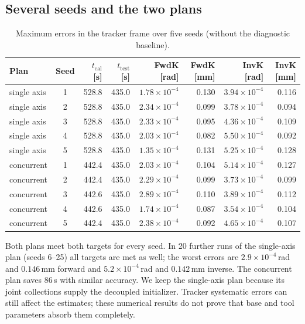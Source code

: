 \documentclass[../main.tex]{subfiles}
\begin{document}
\subsection{Several seeds and the two plans}\label{sec:res-seeds}
\begin{table}[H]
\centering\small
\caption{Maximum errors in the tracker frame over five seeds (without the diagnostic baseline).}\label{tab:res-seeds}
\begin{tabular}{@{}lcrrrrrr@{}}
\toprule
Plan & Seed & $t_{\mathrm{cal}}$ [s] & $t_{\mathrm{test}}$ [s] & FwdK [rad] & FwdK [mm] & InvK [rad] & InvK [mm] \\\midrule
single axis & 1 & 528.8 & 435.0 & $1.78\times10^{-4}$ & 0.130 & $3.94\times10^{-4}$ & 0.116 \\
single axis & 2 & 528.8 & 435.0 & $2.34\times10^{-4}$ & 0.099 & $3.78\times10^{-4}$ & 0.094 \\
single axis & 3 & 528.8 & 435.0 & $2.33\times10^{-4}$ & 0.095 & $4.36\times10^{-4}$ & 0.109 \\
single axis & 4 & 528.8 & 435.0 & $2.03\times10^{-4}$ & 0.082 & $5.50\times10^{-4}$ & 0.092 \\
single axis & 5 & 528.8 & 435.0 & $1.35\times10^{-4}$ & 0.131 & $5.25\times10^{-4}$ & 0.128 \\\midrule
concurrent & 1 & 442.4 & 435.0 & $2.03\times10^{-4}$ & 0.104 & $5.14\times10^{-4}$ & 0.127 \\
concurrent & 2 & 442.4 & 435.0 & $2.29\times10^{-4}$ & 0.099 & $3.73\times10^{-4}$ & 0.099 \\
concurrent & 3 & 442.6 & 435.0 & $2.89\times10^{-4}$ & 0.110 & $3.89\times10^{-4}$ & 0.112 \\
concurrent & 4 & 442.6 & 435.0 & $1.74\times10^{-4}$ & 0.087 & $3.54\times10^{-4}$ & 0.104 \\
concurrent & 5 & 442.4 & 435.0 & $2.38\times10^{-4}$ & 0.092 & $4.65\times10^{-4}$ & 0.107 \\
\bottomrule
\end{tabular}
\end{table}
Both plans meet both targets for every seed. In 20 further runs of the single-axis plan (seeds 6--25) all targets are met as well; the worst errors are $2.9\times10^{-4}$\,rad and $0.146$\,mm forward and $5.2\times10^{-4}$\,rad and $0.142$\,mm inverse. The concurrent plan saves 86\,s with similar accuracy. We keep the single-axis plan because its joint collections supply the decoupled initializer. Tracker systematic errors can still affect the estimates; these numerical results do not prove that base and tool parameters absorb them completely.
\end{document}
